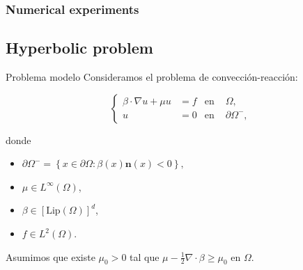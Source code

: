 \subsubsection{Numerical experiments}

\subsection{Hyperbolic problem}

\begin{frame}{Problema modelo}
	Consideramos el problema de convección-reacción:
	\begin{block}{}
	\begin{equation*}
	\label{prob_modelo_hiperbolica}
	\left\{
	\begin{aligned}
	\beta\cdot\nabla u+\mu u&=f & \text{en } &\Omega, \\
	u&=0 & \text{en } &\partial\Omega^-,
	\end{aligned}
	\right.
	\end{equation*}
	\end{block}
	donde 
	\begin{itemize}
		\item $\partial\Omega^-=\left\{x\in\partial\Omega\colon \beta(x)\mathbf{n}(x)<0\right\},$
		\item $\mu\in L^\infty(\Omega)$,
		\item $\beta\in\left[\text{Lip}(\Omega)\right]^d$,
		\item $f\in L^2(\Omega)$.
	\end{itemize}
	\vspace*{.5cm}
	Asumimos que existe $\mu_0>0$ tal que $\displaystyle\mu-\frac{1}{2}\nabla\cdot\beta\geq\mu_0$ en $\Omega$.
	
	\end{frame}
	
